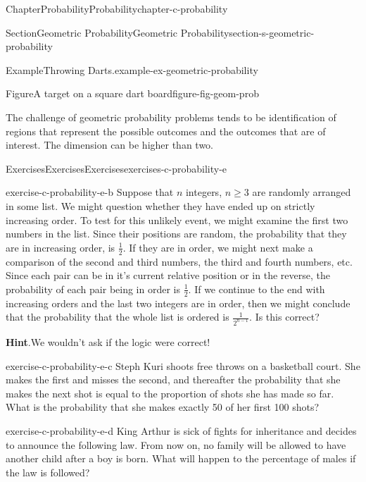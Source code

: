 \documentclass[oneside,10pt,]{book}
\newcommand{\blocktitlefont}{\relax}
\numberwithin{equation}{section}
\begin{document}
\begin{chapterptx}{Chapter}{Probability}{}{Probability}{}{}{chapter-c-probability}
\begin{sectionptx}{Section}{Geometric Probability}{}{Geometric Probability}{}{}{section-s-geometric-probability}
\begin{example}{Example}{Throwing Darts.}{example-ex-geometric-probability}
\begin{figureptx}{Figure}{A target on a square dart board}{figure-fig-geom-prob}{}
\begin{image}{0.2}{0.6}{0.2}{}
\end{image}%
\tcblower
\end{figureptx}%
\end{example}
The challenge of geometric probability problems tends to be identification of regions that represent the possible outcomes and the outcomes that are of interest. The dimension can be higher than two.%
\end{sectionptx}
%
%
\typeout{************************************************}
\typeout{************************************************}
%
\begin{exercises-section}{Exercises}{Exercises}{}{Exercises}{}{}{exercises-c-probability-e}
\begin{divisionexercise}{1}{}{}{exercise-c-probability-e-b}%
Suppose that \(n\)  integers, \(n \geq 3\) are randomly arranged in some list.  We might question whether they have ended up on strictly increasing order.   To test for this unlikely event, we might examine the first two numbers in the list.  Since their positions are random, the probability that they are in increasing order, is \(\frac{1}{2}\). If they are in order, we might next make a comparison of the second and third numbers, the third and fourth numbers, etc. Since each pair can be in it's current relative position or in the reverse, the probability of each pair being in order is \(\frac{1}{2}\). If we continue to the end with increasing orders and the last two integers are in order, then we might conclude that the probability that the whole list is ordered is \(\frac{1}{2^{n-1}}\).  Is this correct?%
\par\smallskip%
\noindent\textbf{\blocktitlefont Hint}.\hypertarget{hint-c-probability-e-b-b}{}\quad{}We wouldn't ask if the logic were correct!%
\end{divisionexercise}%
\begin{divisionexercise}{2}{}{}{exercise-c-probability-e-c}%
Steph Kuri shoots free throws on a basketball court. She makes the first and misses the second, and thereafter the probability that she makes the next shot is equal to the proportion of shots she has made so far. What is the probability that she makes exactly 50 of her first 100 shots?%
\end{divisionexercise}%
\begin{divisionexercise}{3}{}{}{exercise-c-probability-e-d}%
King Arthur is sick of fights for inheritance and decides to announce the following law. From now on, no family will be allowed to have another child after a boy is born. What will happen to the percentage of males if the law is followed?%

\end{divisionexercise}
\end{exercises-section}
\end{chapterptx}
\end{document}
